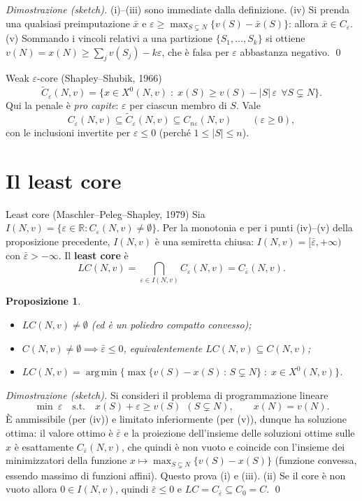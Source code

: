 \documentclass[12pt,a4paper,twoside]{book}
\theoremstyle{plain}
\newtheorem{proposition}[theorem]{Proposizione}
\theoremstyle{definition}
\newcommand{\argmin}{\operatorname*{arg\,min}}
\begin{document}
\textit{Dimostrazione (sketch).} (i)--(iii) sono immediate dalla definizione.
(iv) Si prenda una qualsiasi preimputazione $\bar x$ e
$\varepsilon\ge\max_{S\subsetneq N}\{v(S)-\bar x(S)\}$: allora
$\bar x\in C_{\varepsilon}$. (v) Sommando i vincoli relativi a una partizione
$\{S_1,\dots,S_k\}$ si ottiene $v(N)=x(N)\ge\sum_j v(S_j)-k\varepsilon$, che è
falsa per $\varepsilon$ abbastanza negativo. \qed

\begin{defbox}{Weak $\varepsilon$-core (Shapley--Shubik, 1966)}
\[
  \widetilde{C}_{\varepsilon}(N,v)=\{x\in X^{0}(N,v)\;:\;x(S)\ge v(S)-|S|\,\varepsilon\ \ \forall S\subsetneq N\}.
\]
Qui la penale è \emph{pro capite}: $\varepsilon$ per ciascun membro di $S$. Vale
\[
  C_{\varepsilon}(N,v)\subseteq\widetilde{C}_{\varepsilon}(N,v)\subseteq C_{n\varepsilon}(N,v)
  \qquad(\varepsilon\ge 0),
\]
con le inclusioni invertite per $\varepsilon\le 0$ (perché $1\le|S|\le n$).
\end{defbox}

\section{Il least core}

\begin{defbox}{Least core (Maschler--Peleg--Shapley, 1979)}
Sia $I(N,v)=\{\varepsilon\in\mathbb{R}: C_{\varepsilon}(N,v)\ne\emptyset\}$. Per la
monotonia e per i punti (iv)--(v) della proposizione precedente, $I(N,v)$ è una
semiretta chiusa: $I(N,v)=[\bar\varepsilon,+\infty)$ con $\bar\varepsilon>-\infty$.
Il \textbf{least core} è
\[
  LC(N,v)=\bigcap_{\varepsilon\in I(N,v)}C_{\varepsilon}(N,v)=C_{\bar\varepsilon}(N,v).
\]
\end{defbox}

\begin{proposition}
\begin{itemize}
  \item[(i)] $LC(N,v)\ne\emptyset$ (ed è un poliedro compatto convesso);
  \item[(ii)] $C(N,v)\ne\emptyset\implies\bar\varepsilon\le 0$, equivalentemente $LC(N,v)\subseteq C(N,v)$;
  \item[(iii)] $LC(N,v)=\argmin\bigl\{\max\{v(S)-x(S)\,:\,S\subsetneq N\}\;:\;x\in X^{0}(N,v)\bigr\}$.
\end{itemize}
\end{proposition}

\textit{Dimostrazione (sketch).} Si consideri il problema di programmazione
lineare
\[
  \min\ \varepsilon \quad\text{s.t.}\quad x(S)+\varepsilon\ge v(S)\ \ (S\subsetneq N),\qquad x(N)=v(N).
\]
È ammissibile (per (iv)) e limitato inferiormente (per (v)), dunque ha soluzione
ottima: il valore ottimo è $\bar\varepsilon$ e la proiezione dell'insieme delle
soluzioni ottime sulle $x$ è esattamente $C_{\bar\varepsilon}(N,v)$, che quindi è
non vuoto e coincide con l'insieme dei minimizzatori della funzione
$x\mapsto\max_{S\subsetneq N}\{v(S)-x(S)\}$ (funzione convessa, essendo massimo di
funzioni affini). Questo prova (i) e (iii). (ii) Se il core è non vuoto allora
$0\in I(N,v)$, quindi $\bar\varepsilon\le 0$ e
$LC=C_{\bar\varepsilon}\subseteq C_{0}=C$. \qed
\end{document}
